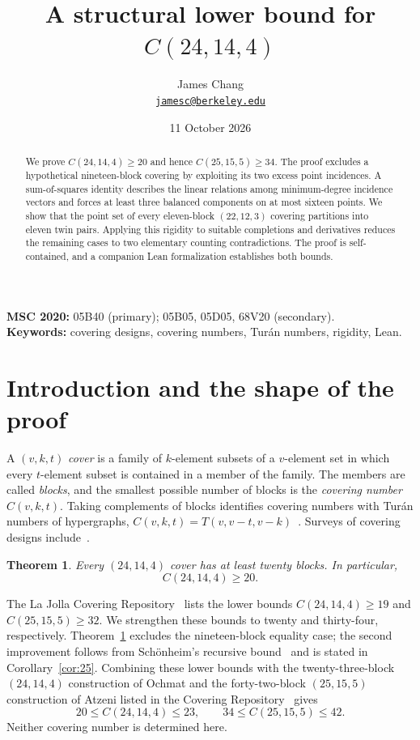 \documentclass[11pt,letterpaper]{article}
\title{A structural lower bound for $C(24,14,4)$}
\author{James Chang\\[3pt]{\small\href{mailto:jamesc@berkeley.edu}{\nolinkurl{jamesc@berkeley.edu}}}}
\date{11 October 2026}
\newtheorem{theorem}{Theorem}[section]
\theoremstyle{definition}\newtheorem{definition}[theorem]{Definition}
\theoremstyle{remark}\newtheorem{remark}[theorem]{Remark}
\begin{document}
\maketitle
\begin{abstract}
We prove $C(24,14,4)\ge20$ and hence $C(25,15,5)\ge34$.
The proof excludes a hypothetical nineteen-block covering by exploiting its two excess point incidences. A sum-of-squares identity describes the linear relations among minimum-degree incidence vectors and forces at least three balanced components on at most sixteen points. We show that the point set of every eleven-block $(22,12,3)$ covering partitions into eleven twin pairs. Applying this rigidity to suitable completions and derivatives reduces the remaining cases to two elementary counting contradictions. The proof is self-contained, and a companion Lean formalization establishes both bounds.
\end{abstract}

{\small\noindent\textbf{MSC 2020:} 05B40 (primary); 05B05, 05D05, 68V20 (secondary).\\
\textbf{Keywords:} covering designs, covering numbers, Tur\'an numbers, rigidity, Lean.}

\section{Introduction and the shape of the proof}\label{sec:intro}
A $(v,k,t)$ \emph{cover} is a family of $k$-element subsets of a $v$-element set in which every $t$-element subset is contained in a member of the family. The members are called \emph{blocks}, and the smallest possible number of blocks is the \emph{covering number} $C(v,k,t)$. Taking complements of blocks identifies covering numbers with Tur\'an numbers of hypergraphs, $C(v,k,t)=T(v,v-t,v-k)$~\cite{Sidorenko}. Surveys of covering designs include~\cite{MillsMullin,GordonStinson}.

\begin{theorem}\label{thm:main}
Every $(24,14,4)$ cover has at least twenty blocks. In particular,
\[
 C(24,14,4)\ge20.
\]
\end{theorem}

The La Jolla Covering Repository~\cite{LJCR} lists the lower bounds $C(24,14,4)\ge19$ and $C(25,15,5)\ge32$. We strengthen these bounds to twenty and thirty-four, respectively. Theorem~\ref{thm:main} excludes the nineteen-block equality case; the second improvement follows from Sch\"onheim's recursive bound~\cite{Schonheim} and is stated in Corollary~\ref{cor:25}. Combining these lower bounds with the twenty-three-block $(24,14,4)$ construction of Ochmat and the forty-two-block $(25,15,5)$ construction of Atzeni listed in the Covering Repository~\cite{CoveringRepository} gives
\[
 20\le C(24,14,4)\le23,\qquad 34\le C(25,15,5)\le42.
\]
Neither covering number is determined here.
\end{document}
